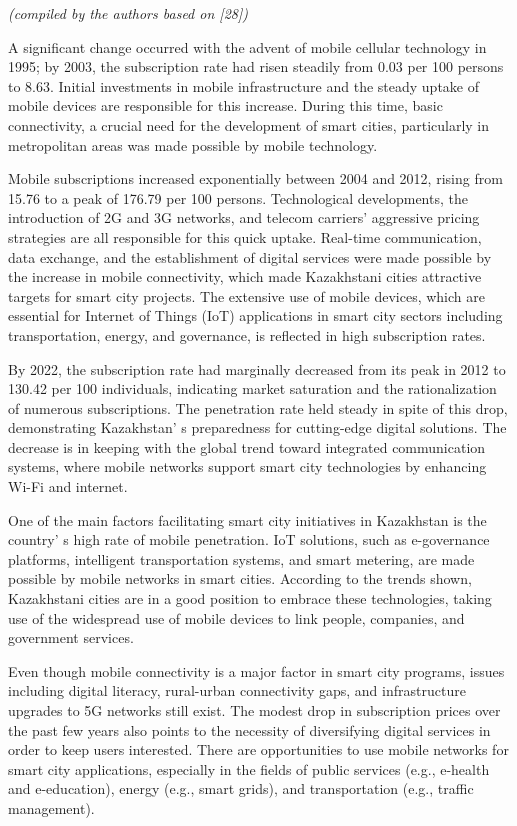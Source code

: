 {\emph{(compiled by the authors based on {[}28{]})}

A significant change occurred with the advent of mobile cellular
technology in 1995; by 2003, the subscription rate had risen steadily
from 0.03 per 100 persons to 8.63. Initial investments in mobile
infrastructure and the steady uptake of mobile devices are responsible
for this increase. During this time, basic connectivity, a crucial need
for the development of smart cities, particularly in metropolitan areas
was made possible by mobile technology.

Mobile subscriptions increased exponentially between 2004 and 2012,
rising from 15.76 to a peak of 176.79 per 100 persons. Technological
developments, the introduction of 2G and 3G networks, and telecom
carriers'{} aggressive pricing strategies are all
responsible for this quick uptake. Real-time communication, data
exchange, and the establishment of digital services were made possible
by the increase in mobile connectivity, which made Kazakhstani cities
attractive targets for smart city projects. The extensive use of mobile
devices, which are essential for Internet of Things (IoT) applications
in smart city sectors including transportation, energy, and governance,
is reflected in high subscription rates.

By 2022, the subscription rate had marginally decreased from its peak in
2012 to 130.42 per 100 individuals, indicating market saturation and the
rationalization of numerous subscriptions. The penetration rate held
steady in spite of this drop, demonstrating Kazakhstan' s
preparedness for cutting-edge digital solutions. The decrease is in
keeping with the global trend toward integrated communication systems,
where mobile networks support smart city technologies by enhancing Wi-Fi
and internet.

One of the main factors facilitating smart city initiatives in
Kazakhstan is the country' s high rate of mobile
penetration. IoT solutions, such as e-governance platforms, intelligent
transportation systems, and smart metering, are made possible by mobile
networks in smart cities. According to the trends shown, Kazakhstani
cities are in a good position to embrace these technologies, taking use
of the widespread use of mobile devices to link people, companies, and
government services.

Even though mobile connectivity is a major factor in smart city
programs, issues including digital literacy, rural-urban connectivity
gaps, and infrastructure upgrades to 5G networks still exist. The modest
drop in subscription prices over the past few years also points to the
necessity of diversifying digital services in order to keep users
interested. There are opportunities to use mobile networks for smart
city applications, especially in the fields of public services (e.g.,
e-health and e-education), energy (e.g., smart grids), and
transportation (e.g., traffic management).

}
